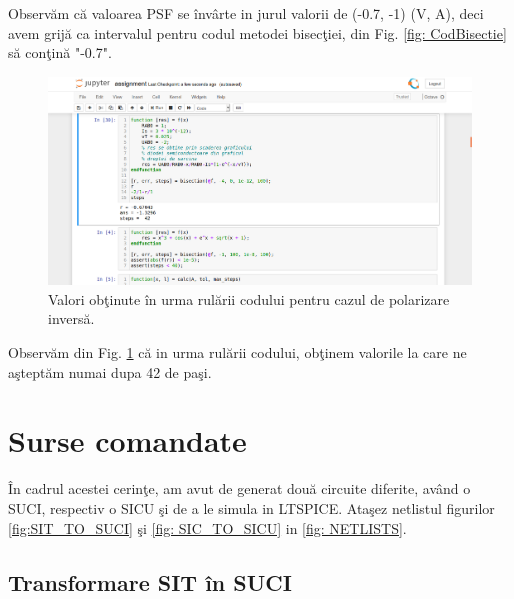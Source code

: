 \documentclass[multi=false, tikz, border=2mm]{article}
\begin{document}
	\vspace{-0.3cm}
	Observ\u{a}m c\u{a} valoarea PSF se \^{i}nv\^{a}rte in jurul valorii de (-0.7, -1) (V, A), deci avem grij\u{a} ca intervalul pentru codul metodei bisec\c{t}iei, din Fig. \ref{fig: CodBisectie} s\u{a} con\c{t}in\u{a} "-0.7". 

	\begin{figure}[H]
	\hspace{.6cm}
	\includegraphics[trim = 200 180 610 110, clip, scale=0.6]{PozaValPolInversa}
	\caption{Valori ob\c{t}inute \^{i}n urma rul\u{a}rii codului pentru cazul de polarizare invers\u{a}.}\label{fig:ValInversa}
\end{figure}

\vspace{-0.3cm}
Observ\u{a}m din Fig. \ref{fig:ValInversa} c\u{a} in urma rul\u{a}rii codului, ob\c{t}inem valorile la care ne a\c{s}tept\u{a}m numai dupa 42 de pa\c{s}i.

\pagebreak	
	
	\section{Surse comandate}
	\vspace{-0.2cm}
	\^{I}n cadrul acestei cerin\c{t}e, am avut de generat dou\u{a} circuite diferite, av\^{a}nd o SUCI, respectiv o SICU \c{s}i de a le simula in LTSPICE. Ata\c{s}ez netlistul figurilor \ref{fig:SIT_TO_SUCI} \c{s}i \ref{fig: SIC_TO_SICU} in \ref{fig: NETLISTS}. %
	\vspace{-0.6cm}
	\subsection{Transformare SIT \^{i}n SUCI}
	
\end{document}
